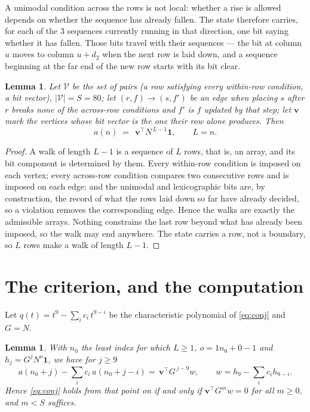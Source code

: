 \documentclass[11pt,a4paper]{article}
\theoremstyle{plain}
\newtheorem{lemma}[theorem]{Lemma}
\theoremstyle{definition}
\begin{document}
A unimodal condition across the rows is not local: whether a
rise is allowed depends on whether the sequence has already fallen. The state therefore
carries, for each of the $3$ sequences currently running in that direction, one bit saying
whether it has fallen. Those bits travel with their sequences --- the bit at column $u$
moves to column $u+d_2$ when the next row is laid down, and a sequence beginning at the
far end of the new row starts with its bit clear.

\begin{lemma}\label{lem:walk}
Let $\mathcal V$ be the set of pairs (a row satisfying every within-row condition, a
bit vector), $|\mathcal V|=S=80$; let $(r,f)\to(s,f')$ be an edge when placing $s$ after $r$
breaks none of the across-row conditions and $f'$ is $f$ updated by that step; let
$\mathbf{v}$ mark the vertices whose bit vector is the one their row alone produces.
Then
\[
a(n)\;=\;\,\mathbf{v}^{\!\top}N^{\,L-1}\mathbf{1},\qquad L=n.
\]
\end{lemma}

\begin{proof}
A walk of length $L-1$ is a sequence of $L$ rows, that is, an array, and its bit component
is determined by them. Every within-row condition is imposed on each vertex; every
across-row condition compares two consecutive rows and is imposed on each edge; and the
unimodal and lexicographic bits are, by construction, the record of what the rows laid down
so far have already decided, so a violation removes the corresponding edge. Hence the walks
are exactly the admissible arrays. Nothing constrains the last row beyond what has already
been imposed, so the walk may end anywhere. The state carries a row, not a boundary, so
$L$ rows make a walk of length $L-1$.
\end{proof}

\section{The criterion, and the computation}

Let $q(t)=t^{9}-\sum_i c_i\,t^{9-i}$ be the characteristic polynomial of
\eqref{eq:conj} and $G=N$.

\begin{lemma}\label{lem:crit}
With $n_0$ the least index for which $L\ge1$, $o=1n_0+0-1$ and
$h_j=G^{j}N^{o}\mathbf{1}$, we have for $j\ge9$
\[
a(n_0+j)-\sum_i c_i\,a(n_0+j-i)=\,\mathbf{v}^{\!\top}G^{\,j-9}w,
\qquad w=h_{9}-\sum_i c_ih_{9-i} .
\]
Hence \eqref{eq:conj} holds from that point on if and only if
$\mathbf{v}^{\!\top}G^{m}w=0$ for all $m\ge0$, and $m<S$ suffices.
\end{lemma}
\end{document}
